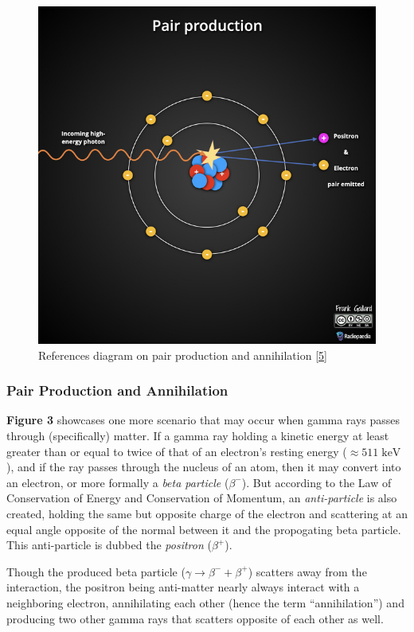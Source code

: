 \documentclass[12pt]{article}
\begin{document}
\begin{multicols}{2}
\begin{figure}[H]
    \centering
    \includegraphics[width=0.98\linewidth]{figs/fig3.jpeg}
    \caption{
        References diagram on pair production and annihilation [\hyperref[sec:5]{5}]
    }
\end{figure}
\noindent
\subsubsection{Pair Production and Annihilation}
\textbf{Figure 3} showcases one more scenario that may occur when gamma rays
passes through (specifically) matter. If a gamma ray holding a kinetic energy
at least greater than or equal to twice of that of an electron's resting energy
($\approx511\;\mathrm{keV}$), and if the ray passes through the nucleus of an atom,
then it may convert into an electron, or more formally a \textit{beta particle}
($\beta^-$). But according to the Law of Conservation of Energy and Conservation
of Momentum, an \textit{anti-particle} is also created, holding the same but opposite
charge of the electron and scattering at an equal angle opposite of the normal
between it and the propogating beta particle. This anti-particle is dubbed the
\textit{positron} ($\beta^+$).

Though the produced beta particle ($\gamma\rightarrow\beta^-+\beta^+$)
scatters away from the interaction, the positron being anti-matter nearly always
interact with a neighboring electron, annihilating each other (hence the term
``annihilation'') and producing two other gamma rays that scatters opposite of
each other as well.


\end{multicols}
\end{document}
